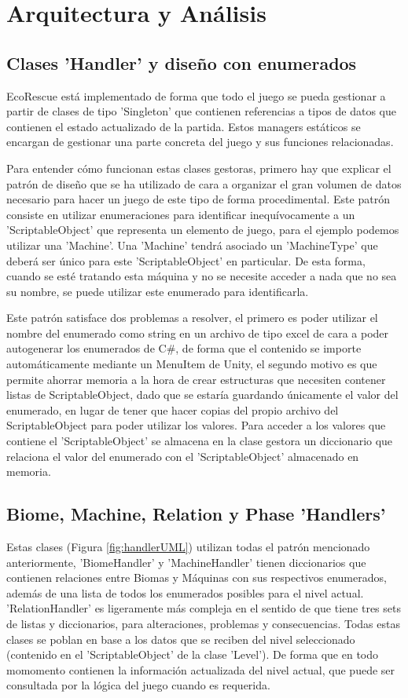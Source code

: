 \section{Arquitectura y Análisis}
\subsection{Clases 'Handler' y diseño con enumerados}
EcoRescue está implementado de forma que todo el juego se pueda gestionar a partir de clases de tipo 'Singleton' que contienen referencias a tipos de datos que contienen el estado actualizado de la partida. Estos managers estáticos se encargan de gestionar una parte concreta del juego y sus funciones relacionadas.

Para entender cómo funcionan estas clases gestoras, primero hay que explicar el patrón de diseño que se ha utilizado de cara a organizar el gran volumen de datos necesario para hacer un juego de este tipo de forma procedimental. Este patrón consiste en utilizar enumeraciones para identificar inequívocamente a un 'ScriptableObject' que representa un elemento de juego, para el ejemplo podemos utilizar una 'Machine'. Una 'Machine' tendrá asociado un 'MachineType' que deberá ser único para este 'ScriptableObject' en particular. De esta forma, cuando se esté tratando esta máquina y no se necesite acceder a nada que no sea su nombre, se puede utilizar este enumerado para identificarla. 

Este patrón satisface dos problemas a resolver, el primero es poder utilizar el nombre del enumerado como string en un archivo de tipo excel de cara a poder autogenerar los enumerados de C\#, de forma que el contenido se importe automáticamente mediante un MenuItem de Unity, el segundo motivo es que permite ahorrar memoria a la hora de crear estructuras que necesiten contener listas de ScriptableObject, dado que se estaría guardando únicamente el valor del enumerado, en lugar de tener que hacer copias del propio archivo del ScriptableObject para poder utilizar los valores. Para acceder a los valores que contiene el 'ScriptableObject' se almacena en la clase gestora un diccionario que relaciona el valor del enumerado con el 'ScriptableObject' almacenado en memoria. 

\subsection{Biome, Machine, Relation y Phase 'Handlers'}

Estas clases (Figura \ref{fig:handlerUML}) utilizan todas el patrón mencionado anteriormente, 'BiomeHandler' y 'MachineHandler' tienen diccionarios que contienen relaciones entre Biomas y Máquinas con sus respectivos enumerados, además de una lista de todos los enumerados posibles para el nivel actual. 'RelationHandler' es ligeramente más compleja en el sentido de que tiene tres sets de listas y diccionarios, para alteraciones, problemas y consecuencias. Todas estas clases se poblan en base a los datos que se reciben del nivel seleccionado (contenido en el 'ScriptableObject' de la clase 'Level'). De forma que en todo momomento contienen la información actualizada del nivel actual, que puede ser consultada por la lógica del juego cuando es requerida. 

